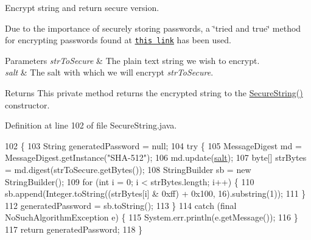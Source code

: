 Encrypt string and return secure version.

Due to the importance of securely storing passwords, a \char`\"{}tried and true\char`\"{} method for encrypting passwords found at \href{https://howtodoinjava.com/security/how-to-generate-secure-password-hash-md5-sha-pbkdf2-bcrypt-examples/}{\tt this link} has been used.


\begin{DoxyParams}{Parameters}
{\em str\+To\+Secure} & The plain text string we wish to encrypt. \\
\hline
{\em salt} & The salt with which we will encrypt {\itshape str\+To\+Secure}.\\
\hline
\end{DoxyParams}
\begin{DoxyReturn}{Returns}
This private method returns the encrypted string to the \mbox{\hyperlink{classcom_1_1activitytracker_1_1_secure_string_a889fcbf0c1f771962ac81886f49e389e}{Secure\+String()}} constructor. 
\end{DoxyReturn}


Definition at line 102 of file Secure\+String.\+java.


\begin{DoxyCode}
102                                                                                      \{
103         String generatedPassword = null;
104         \textcolor{keywordflow}{try} \{
105             MessageDigest md = MessageDigest.getInstance(\textcolor{stringliteral}{"SHA-512"});
106             md.update(\mbox{\hyperlink{classcom_1_1activitytracker_1_1_secure_string_a8549ead1f186ff0c2520818b03d1cc21}{salt}});
107             byte[] strBytes = md.digest(strToSecure.getBytes());
108             StringBuilder sb = \textcolor{keyword}{new} StringBuilder();
109             \textcolor{keywordflow}{for} (\textcolor{keywordtype}{int} i = 0; i < strBytes.length; i++) \{
110                 sb.append(Integer.toString((strBytes[i] & 0xff) + 0x100, 16).substring(1));
111             \}
112             generatedPassword = sb.toString();
113         \}
114         \textcolor{keywordflow}{catch} (\textcolor{keyword}{final} NoSuchAlgorithmException e) \{
115             System.err.println(e.getMessage());
116         \}
117         \textcolor{keywordflow}{return} generatedPassword;
118     \}
\end{DoxyCode}
\mbox{\label{classcom_1_1activitytracker_1_1_secure_string_ab5369653852da122aba874f35cbda9a5}} 
